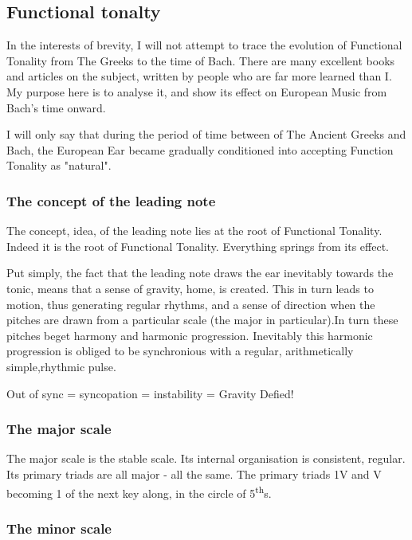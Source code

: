 \documentclass{article}
\begin{document}
\subsection{Functional tonalty}

In the interests of brevity, I will not attempt to trace the evolution of Functional Tonality from The Greeks to the time of Bach.
There are many excellent books and articles on the subject, written by people who are far more learned than I.
My purpose here is to analyse it, and show its effect on European Music from Bach's time onward.

I will only say that during the period of time between of The Ancient Greeks and Bach, the European Ear became gradually conditioned into accepting Function Tonality as "natural".

\subsubsection{The concept of the leading note}

The concept, idea, of the leading note lies at the root of Functional Tonality.
Indeed it is the root of Functional Tonality.
Everything springs from its effect.

Put simply, the fact that the leading note draws the ear inevitably towards the tonic, means that a sense of gravity, home, is created.
This in turn leads to motion, thus generating regular rhythms, and a sense of direction when the pitches are drawn from a particular scale (the major in particular).In turn these pitches beget harmony and harmonic progression.
Inevitably this harmonic progression is obliged to be synchronious with a regular, arithmetically simple,rhythmic pulse.

Out of sync = syncopation = instability = Gravity Defied!

\subsubsection{The major scale}

The major scale is the stable scale.
Its internal organisation is consistent, regular.
Its primary triads are all major - all the same.
The primary triads 1V and V becoming 1 of the next key along, in the circle of 5\textsuperscript{th}s.

\subsubsection{The minor scale}
\end{document}
